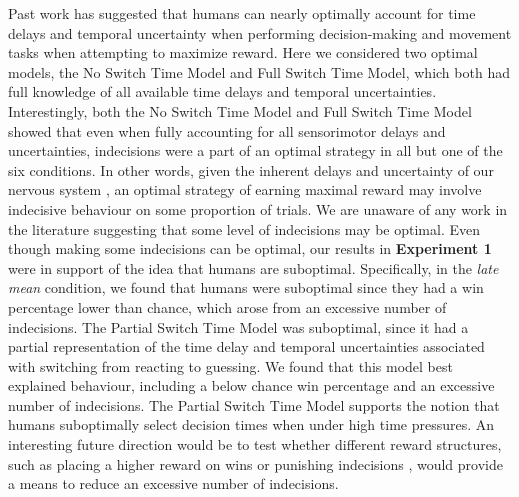 \documentclass[man,donotrepeattitle,floatsintext,letterpaper,12pt]{apa7}
\newcommand\boldblue[1]{\textcolor{mydarkblue}{\textbf{#1}}}
\begin{document}
Past work has suggested that humans can nearly optimally account for time delays and temporal uncertainty when performing decision-making \autocite{balciRiskAssessmentMan2009,jazayeriTemporalContextCalibrates2010,balciOptimalTemporalRisk2011} and movement tasks \autocite{hudsonOptimalCompensationTemporal2008,deanTradingSpeedAccuracy2007} when attempting to maximize reward. Here we considered two optimal models, the No Switch Time Model and Full Switch Time Model, which both had full knowledge of all available time delays and temporal uncertainties. Interestingly, both the No Switch Time Model and Full Switch Time Model showed that even when fully accounting for all sensorimotor delays and uncertainties, indecisions were a part of an optimal strategy in all but one of the six conditions. In other words, given the inherent delays and uncertainty of our nervous system \autocite{faisalNoiseNervousSystem2008}, an optimal strategy of earning maximal reward may involve indecisive behaviour on some proportion of trials. We are unaware of any work in the literature suggesting that some level of indecisions may be optimal. Even though making some indecisions can be optimal, our results in \boldblue{Experiment 1} were in support of the idea that humans are suboptimal. Specifically, in the \emph{late mean} condition, we found that humans were suboptimal since they had a win percentage lower than chance, which arose from an excessive number of indecisions. The Partial Switch Time Model was suboptimal, since it had a partial representation of the time delay and temporal uncertainties associated with switching from reacting to guessing. We found that this model best explained behaviour, including a below chance win percentage and an excessive number of indecisions. The Partial Switch Time Model supports the notion that humans suboptimally select decision times when under high time pressures. An interesting future direction would be to test whether different reward structures, such as placing a higher reward on wins or punishing indecisions \autocite{kahnemanProspectTheoryAnalysis2013,rothReinforcementbasedProcessesActively2023,rothPunishmentLeadsGreater2024,galeaDissociableEffectsPunishment2015}, would provide a means to reduce an excessive number of indecisions.
\end{document}
